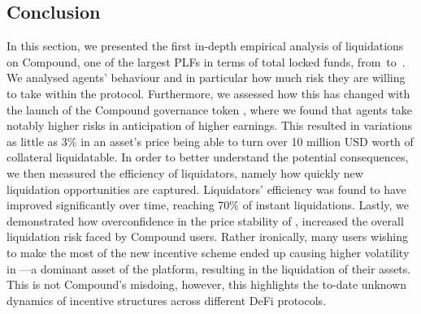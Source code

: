 \subsection{Conclusion}
\label{sec:5b:conclusion}
In this section, we presented the first in-depth empirical analysis of liquidations on Compound, one of the largest PLFs in terms of total locked funds, from~\StartDate to~\EndDate.
We analysed agents' behaviour and in particular how much risk they are willing to take within the protocol.
Furthermore, we assessed how this has changed with the launch of the Compound governance token , where we found that agents take notably higher risks in anticipation of higher earnings.
This resulted in variations as little as 3\% in an asset's price being able to turn over 10 million USD worth of collateral liquidatable.
In order to better understand the potential consequences, we then measured the efficiency of liquidators, namely how quickly new liquidation opportunities are captured. Liquidators' efficiency was found to have improved significantly over time, reaching 70\% of instant liquidations.
Lastly, we demonstrated how overconfidence in the price stability of , increased the overall liquidation risk faced by Compound users.
Rather ironically, many users wishing to make the most of the new incentive scheme ended up causing higher volatility in ---a dominant asset of the platform, resulting in the liquidation of their assets.
This is not Compound's misdoing, however, this highlights the to-date unknown dynamics of incentive structures across different DeFi protocols.
